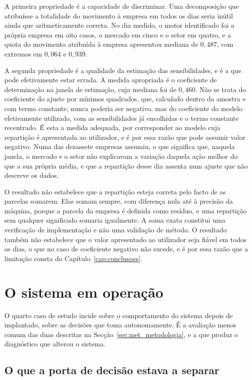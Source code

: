 A primeira propriedade é a capacidade de discriminar. Uma decomposição que atribuísse a totalidade do
movimento à empresa em todos os dias seria inútil ainda que aritmeticamente correta. No dia medido, o
motor identificado foi a própria empresa em oito casos, o mercado em cinco e o setor em quatro, e a
quota do movimento atribuída à empresa apresentou mediana de $0{,}487$, com extremos em $0{,}064$ e
$0{,}939$.

A segunda propriedade é a qualidade da estimação das sensibilidades, e é a que pode efetivamente
estar errada. A medida apropriada é o coeficiente de determinação na janela de estimação, cuja
mediana foi de $0{,}460$. Não se trata do coeficiente do ajuste por mínimos quadrados, que, calculado
dentro da amostra e com termo constante, nunca poderia ser negativo, mas do coeficiente do modelo
efetivamente utilizado, com as sensibilidades já encolhidas e o termo constante recentrado. É esta a
medida adequada, por corresponder ao modelo cuja repartição é apresentada ao utilizador, e é por essa
razão que pode assumir valor negativo. Numa das dezassete empresas assumiu, o que significa que,
naquela janela, o mercado e o setor não explicavam a variação daquela ação melhor do que a sua própria
média, e que a repartição desse dia assenta num ajuste que não descreve os dados.

O resultado não estabelece que a repartição esteja correta pelo facto de as parcelas somarem. Elas
somam sempre, com diferença nula até à precisão da máquina, porque a parcela da empresa é definida
como resíduo, e uma repartição sem qualquer significado somaria igualmente. A soma exata constitui
uma verificação de implementação e não uma validação de método. O resultado também não estabelece que
o valor apresentado ao utilizador seja fiável em todos os dias, o que no caso de coeficiente negativo
não sucede, e é por essa razão que a limitação consta do Capítulo~\ref{cap:conclusoes}.

\section{O sistema em operação}
\label{sec:av_producao}

O quarto caso de estudo incide sobre o comportamento do sistema depois de implantado, sobre as
decisões que toma autonomamente. É a avaliação menos comum das duas descritas na
Secção~\ref{sec:met_metodologia}, e a que produz o diagnóstico que alterou o sistema.

\subsection{O que a porta de decisão estava a separar}

